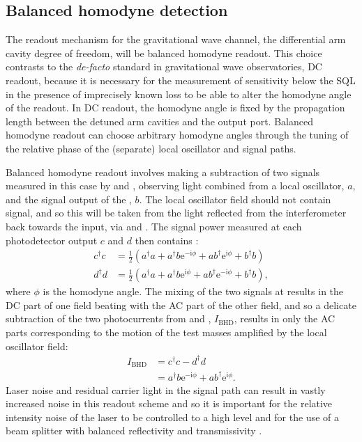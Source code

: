 \subsection{\label{sec:bhd-intro}Balanced homodyne detection}
The readout mechanism for the gravitational wave channel, the differential arm cavity degree of freedom, will be balanced homodyne readout. This choice contrasts to the \emph{de-facto} standard in gravitational wave observatories, \gls{DC} readout, because it is necessary for the measurement of sensitivity below the \gls{SQL} in the presence of imprecisely known loss to be able to alter the homodyne angle of the readout. In \gls{DC} readout, the homodyne angle is fixed by the propagation length between the detuned arm cavities and the output port. Balanced homodyne readout can choose arbitrary homodyne angles through the tuning of the relative phase of the (separate) local oscillator and signal paths.

Balanced homodyne readout involves making a subtraction of two signals measured in this case by \HDA{} and \HDB{}, observing light combined from a local oscillator, $a$, and the signal output of the \SSM{}, $b$. The local oscillator field should not contain signal, and so this will be taken from the light reflected from the interferometer back towards the input, via \MTWELVE{} and \MTHIRTEEN{}. The signal power measured at each photodetector output $c$ and $d$ then contains \cite{Steinlechner2015}:
\begin{equation}
  \begin{split}
    c^{\dag} c &= \frac{1}{2} \left( a^{\dag} a + a^{\dag} b \text{e}^{-\text{i} \phi} + a b^{\dag} \text{e}^{\text{i} \phi} + b^{\dag} b \right) \\
    d^{\dag} d &= \frac{1}{2} \left( a^{\dag} a + a^{\dag} b \text{e}^{\text{i} \phi} + a b^{\dag} \text{e}^{-\text{i} \phi} + b^{\dag} b \right),
  \end{split}
\end{equation}
where $\phi$ is the homodyne angle. The mixing of the two signals at \MSIXTEEN{} results in the \gls{DC} part of one field beating with the \gls{AC} part of the other field, and so a delicate subtraction of the two photocurrents from \HDA{} and \HDB{}, $I_{\text{BHD}}$, results in only the \gls{AC} parts corresponding to the motion of the test masses amplified by the local oscillator field:
\begin{equation}
  \begin{split}
    I_{\text{BHD}} &= c^{\dag} c - d^{\dag} d \\
                   &= a^{\dag} b \text{e}^{-\text{i} \phi} + a b^{\dag} \text{e}^{\text{i} \phi}.
  \end{split}
\end{equation}
Laser noise and residual carrier light in the signal path can result in vastly increased noise in this readout scheme and so it is important for the relative intensity noise of the laser to be controlled to a high level and for the use of a beam splitter with balanced reflectivity and transmissivity \cite{Steinlechner2015}.

